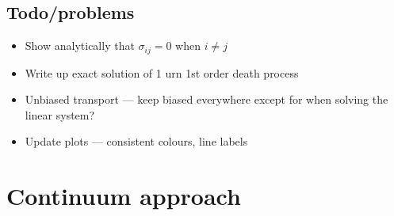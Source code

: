 \documentclass[a4paper,11pt]{report}
\numberwithin{equation}{section}
\begin{document}
\FloatBarrier
\section{Todo/problems}
\begin{itemize}
    \item Show analytically that \(\sigma_{ij} = 0\) when \(i \neq j\)
    \item Write up exact solution of 1 urn 1st order death process
    \item Unbiased transport --- keep biased everywhere except for when solving
        the linear system?
    \item Update plots --- consistent colours, line labels
\end{itemize}

\chapter{Continuum approach}


\end{document}
